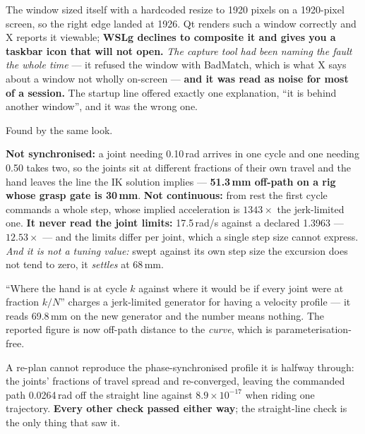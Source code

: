 {The window sized itself with a hardcoded resize to 1920 pixels on a 1920-pixel
screen, so the right edge landed at 1926. Qt renders such a window correctly and
X reports it viewable; \textbf{WSLg declines to composite it and gives you a
taskbar icon that will not open.} \textit{The capture tool had been naming the
fault the whole time} --- it refused the window with BadMatch, which is what X
says about a window not wholly on-screen --- \textbf{and it was read as noise for
most of a session.} The startup line offered exactly one explanation, ``it is
behind another window'', and it was the wrong one.}

{Found by the same look.}

{\textbf{Not synchronised:} a joint needing 0.10\,rad arrives in one cycle and
one needing 0.50 takes two, so the joints sit at different fractions of their own
travel and the hand leaves the line the IK solution implies ---
\textbf{51.3\,mm off-path on a rig whose grasp gate is 30\,mm}.
\textbf{Not continuous:} from rest the first cycle commands a whole step, whose
implied acceleration is $1343\times$ the jerk-limited one.
\textbf{It never read the joint limits:} 17.5\,rad/s against a declared
1.3963 --- $12.53\times$ --- and the limits differ per joint, which a single step
size cannot express. \textit{And it is not a tuning value:} swept against its own
step size the excursion does not tend to zero, it \emph{settles} at 68\,mm.}

{``Where the hand is at cycle $k$ against where it would be if every joint were
at fraction $k/N$'' charges a jerk-limited generator for having a velocity
profile --- it reads 69.8\,mm on the new generator and the number means nothing.
The reported figure is now off-path distance to the \emph{curve}, which is
parameterisation-free.}

{A re-plan cannot reproduce the phase-synchronised profile it is halfway
through: the joints' fractions of travel spread and re-converged, leaving the
commanded path 0.0264\,rad off the straight line against $8.9\times10^{-17}$ when
riding one trajectory. \textbf{Every other check passed either way}; the
straight-line check is the only thing that saw it.}

